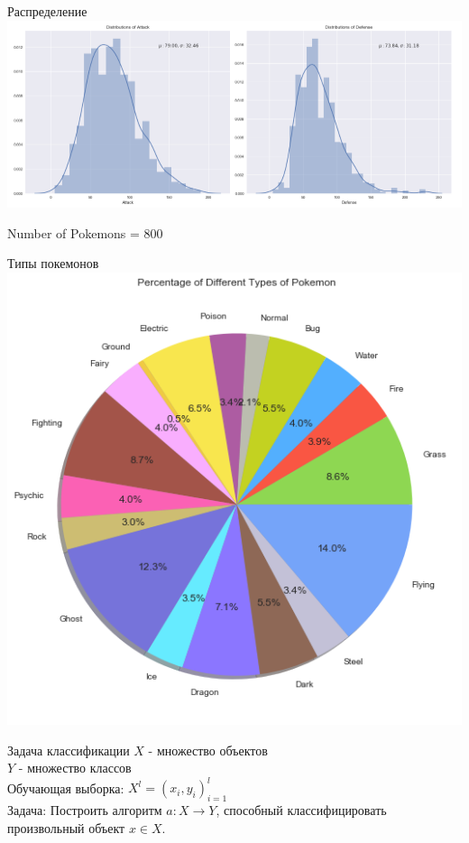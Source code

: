 \documentclass[10pt]{beamer}
\begin{document}
\begin{frame}{Распределение}
    \centering
	\includegraphics[width=\textwidth]{images/attack_defense}
	
	Number of Pokemons = 800
\end{frame}

{
\begin{frame}{Типы покемонов}
    \centering
	\includegraphics[width=\linewidth,height=0.8 \textheight,keepaspectratio]{images/pokemons_by_type}
\end{frame}
}

\begin{frame}{Задача классификации}
	$X$ - множество объектов \\
	$Y$ - множество классов \\
	Обучающая выборка: ${X^l = (x_i, y_i)_{i=1}^l}$ \\ 
	\bigbreak
	\bigbreak
	\alert{Задача}: Построить алгоритм ${a \colon X \rightarrow Y}$, способный классифицировать произвольный объект ${x \in X}$.
\end{frame}
\end{document}
